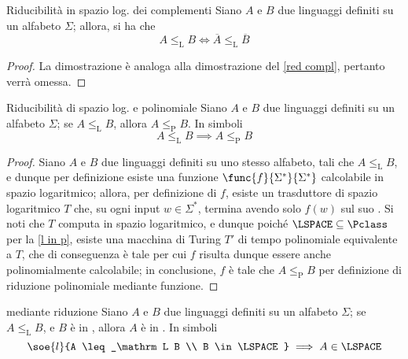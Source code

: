 \documentclass[a4paper, 12pt]{report}
\begin{document}
    \begin{framedlem}[label={l red compl}]{Riducibilità in spazio log. dei complementi}
        Siano $A$ e $B$ due linguaggi definiti su un alfabeto $\Sigma$; allora, si ha che $$A \leq_\mathrm L B \iff \overline A \leq_\mathrm L \overline B$$
    \end{framedlem}

    \begin{proof}
        La dimostrazione è analoga alla dimostrazione del \cref{red compl}, pertanto verrà omessa.
    \end{proof}

    \begin{framedlem}[label={l red into p red}]{Riducibilità di spazio log. e polinomiale}
        Siano $A$ e $B$ due linguaggi definiti su un alfabeto $\Sigma$; se $A \leq_\mathrm L B$, allora $A \leq_\mathrm P B$. In simboli $$A \leq_\mathrm L B \implies A \leq_\mathrm P B$$
    \end{framedlem}

    \begin{proof}
        Siano $A$ e $B$ due linguaggi definiti su uno stesso alfabeto, tali che $A \leq_\mathrm L B$, e dunque per definizione esiste una funzione $\func{f}{\Sigma^*}{\Sigma^*}$ calcolabile in spazio logaritmico; allora, per definizione di $f$, esiste un trasduttore di spazio logaritmico $T$ che, su ogni input $w \in \Sigma^*$, termina avendo solo $f(w)$ sul suo . Si noti che $T$ computa in spazio logaritmico, e dunque poiché $\LSPACE \subseteq \Pclass$ per la \cref{l in p}, esiste una macchina di Turing $T'$ di tempo polinomiale equivalente a $T$, che di conseguenza è tale per cui $f$ risulta dunque essere anche polinomialmente calcolabile; in conclusione, $f$ è tale che $A \leq_\mathrm P B$ per definizione di riduzione polinomiale mediante funzione.
    \end{proof}

    \begin{framedthm}[label={l w red}]{\LSPACE mediante riduzione}
        Siano $A$ e $B$ due linguaggi definiti su un alfabeto $\Sigma$; se $A \leq_\mathrm L B$, e $B$ è in \LSPACE, allora $A$ è in \LSPACE. In simboli $$\soe{l}{A \leq_\mathrm L B \\ B \in \LSPACE} \implies A \in \LSPACE$$
    \end{framedthm}
\end{document}
